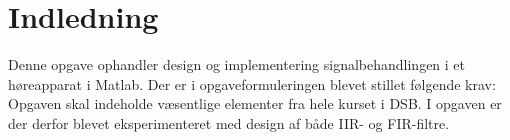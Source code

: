 \chapter{Indledning}\label{ch:introduction}
Denne opgave ophandler design og implementering signalbehandlingen i et høreapparat i Matlab. Der er i opgaveformuleringen blevet stillet følgende krav: Opgaven skal indeholde væsentlige elementer fra hele kurset i DSB. 
I opgaven er der  derfor blevet eksperimenteret med design af både IIR- og FIR-filtre.


